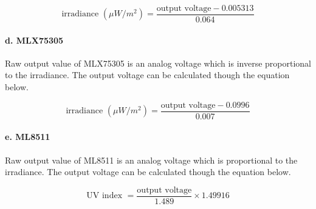 \bigbreak

{\centering
 \[ \text{irradiance } (\mu W/m^2) = \frac{\text{output voltage} - 0.005313}{0.064} \]
 \par
 }
 

\paragraph{d. MLX75305}

Raw output value of MLX75305 is an analog voltage which is inverse proportional to the irradiance. The output voltage can be calculated though the equation below.

\bigbreak

{\centering
 \[ \text{irradiance } (\mu W/m^2) = \frac{\text{output voltage} - 0.0996}{0.007} \]
 \par
 }
 

\paragraph{e. ML8511}

Raw output value of ML8511 is an analog voltage which is proportional to the irradiance. The output voltage can be calculated though the equation below.

\bigbreak

{\centering
 \[ \text{UV index } = \frac{\text{output voltage}}{1.489} \times 1.49916 \]
 \par
 }
 


